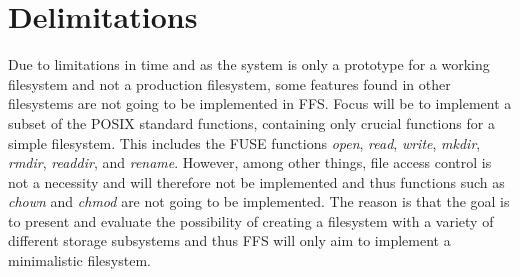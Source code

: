 \section{Delimitations} %

Due to limitations in time and as the system is only a prototype for a working filesystem and not a production filesystem, some features found in other filesystems are not going to be implemented in FFS. Focus will be to implement a subset of the POSIX standard functions, containing only crucial functions for a simple filesystem. This includes the FUSE functions \textit{open}, \textit{read}, \textit{write}, \textit{mkdir}, \textit{rmdir}, \textit{readdir}, and \textit{rename}. However, among other things, file access control is not a necessity and will therefore not be implemented and thus functions such as \textit{chown} and \textit{chmod} are not going to be implemented. The reason is that the goal is to present and evaluate the possibility of creating a filesystem with a variety of different storage subsystems and thus FFS will only aim to implement a minimalistic filesystem. 